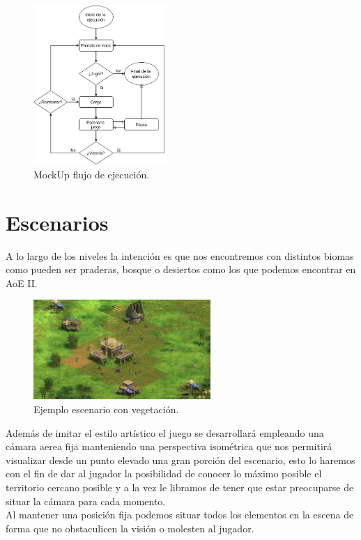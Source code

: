 \begin{figure}[ht]
\centering
\includegraphics[width=0.45\textwidth]{imagenes/gdd/pantallas/flow_ejecucion.png}
\caption{MockUp flujo de ejecución.}
\label{esq:flow_juego}
\end{figure}

\section{Escenarios}
A lo largo de los niveles la intención es que nos encontremos con distintos biomas como
pueden ser praderas, bosque o desiertos como los que podemos encontrar en \ac{AoE} II.

\begin{figure}[ht]
\centering
\includegraphics[width=0.6\textwidth]{imagenes/gdd/mapa_aoe_1.jpg}
\caption{Ejemplo escenario con vegetación.}
\label{img:mapa_aoe1}
\end{figure}

Además de imitar el estilo artístico el juego se desarrollará empleando una cámara
aerea fija manteniendo una perspectiva isométrica que nos permitirá visualizar desde
un punto elevado una gran porción del escenario, esto lo haremos con el fin de dar al
jugador la posibilidad de conocer lo máximo posible el territorio cercano posible y a la
vez le libramos de tener que estar preocuparse de situar la cámara para cada momento. \\
Al mantener una posición fija podemos situar todos los elementos en la escena de forma
que no obstaculicen la visión o molesten al jugador.


